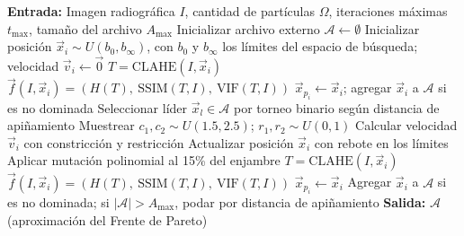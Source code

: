 \documentclass[sigplan,screen]{acmart}
\begin{document}
\begin{algorithm}
\caption{SMPSO-CLAHE}
\label{ps:ps1}
\begin{algorithmic}[1]
\State \textbf{Entrada:} Imagen radiográfica $I$, cantidad de partículas $\Omega$, iteraciones máximas $t_{\max}$, tamaño del archivo $A_{\max}$
\State Inicializar archivo externo $\mathcal{A} \gets \emptyset$
    \State Inicializar posición $\vec{x}_i \sim U(b_0, b_\infty)$, con $b_0$ y $b_\infty$ los límites del espacio de búsqueda; velocidad $\vec{v}_i \gets \vec{0}$
    \State $T = \text{CLAHE}(I, \vec{x}_i)$
    \State $\vec{f}(I,\vec{x}_i) = \left( H(T),\ \text{SSIM}(T, I),\ \text{VIF}(T, I) \right)$ 
    \State $\vec{x}_{p_i} \gets \vec{x}_i$; agregar $\vec{x}_i$ a $\mathcal{A}$ si es no dominada 
\EndFor
{}
        \State Seleccionar líder $\vec{x}_l \in \mathcal{A}$ por torneo binario según distancia de apiñamiento
        \State Muestrear $c_1, c_2 \sim U(1.5, 2.5)$; $r_1, r_2 \sim U(0,1)$
        \State Calcular velocidad $\vec{v}_i$ con constricción y restricción 
        \State Actualizar posición $\vec{x}_i$ con rebote en los límites 
        \State Aplicar mutación polinomial al 15\% del enjambre
        \State $T = \text{CLAHE}(I, \vec{x}_i)$
        \State $\vec{f}(I,\vec{x}_i) = \left( H(T),\ \text{SSIM}(T, I),\ \text{VIF}(T, I) \right)$
         
            \State $\vec{x}_{p_i} \gets \vec{x}_i$
        \EndIf
        \State Agregar $\vec{x}_i$ a $\mathcal{A}$ si es no dominada; si $|\mathcal{A}| > A_{\max}$, podar por distancia de apiñamiento
    \EndFor
\EndFor
\State \textbf{Salida:} $\mathcal{A}$ (aproximación del Frente de Pareto)
\end{algorithmic}
\end{algorithm}
\end{document}
